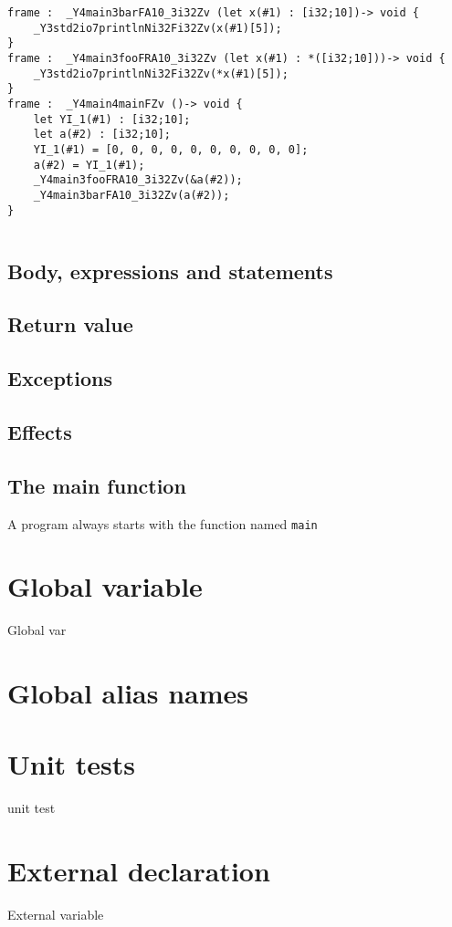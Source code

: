 \begin{lstlisting}[style=intermediateVerb]
frame :  _Y4main3barFA10_3i32Zv (let x(#1) : [i32;10])-> void {
    _Y3std2io7printlnNi32Fi32Zv(x(#1)[5]);
}
frame :  _Y4main3fooFRA10_3i32Zv (let x(#1) : *([i32;10]))-> void {
    _Y3std2io7printlnNi32Fi32Zv(*x(#1)[5]);
}
frame :  _Y4main4mainFZv ()-> void {
    let YI_1(#1) : [i32;10];
    let a(#2) : [i32;10];
    YI_1(#1) = [0, 0, 0, 0, 0, 0, 0, 0, 0, 0];
    a(#2) = YI_1(#1);
    _Y4main3fooFRA10_3i32Zv(&a(#2));
    _Y4main3barFA10_3i32Zv(a(#2));
}
\end{lstlisting}

\begin{lstlisting}

\end{lstlisting}

\subsection {Body, expressions and statements}

\subsection {Return value}

\subsection {Exceptions}

\subsection {Effects}

\subsection{The main function}
A program always starts with the function named \texttt{main}



\section{Global variable}%
\label{sec:global_variables}

Global var

\section{Global alias names}
\label{sec:global_alias_names}

\section{Unit tests}%
\label{sec:unit_test}

unit test

\section{External declaration}%
\label{sec:extern_var}

External variable
